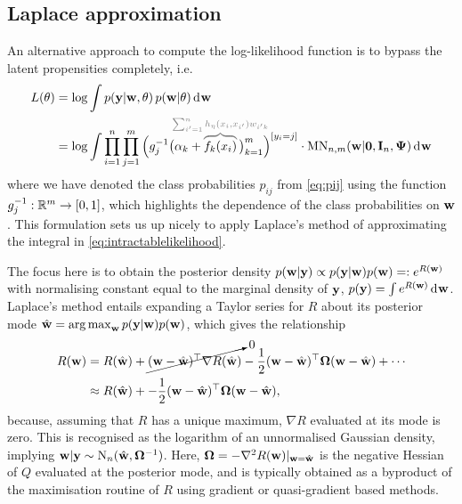 \subsection{Laplace approximation}

An alternative approach to compute the log-likelihood function is to bypass the latent propensities completely, i.e.
\begin{align}
  L(\theta) 
  &= \log \int p(\by | \bw, \theta) \, p(\bw|\theta) \dint \bw \nonumber \\
  &= \log \int \prod_{i=1}^n \prod_{j=1}^m \Big( g_j^{-1}\big(\alpha_k + 
  \greyoverbrace{f_k(x_i)}{\hidewidth\sum_{i'=1}^n h_\eta(x_i,x_{i'})w_{i'k}\hidewidth}
  \,\big)_{k=1}^m \Big)^{[y_i=j]} \cdot \MN_{n,m}(\bw|\bzero,\bI_n, \bPsi) \dint \bw \label{eq:intractablelikelihood}
\end{align}
where we have denoted the class probabilities $p_{ij}$ from \cref{eq:pij} using the function $g_j^{-1}:\mathbb{R}^m \to [0,1]$, which highlights the dependence of the class probabilities on ${\mathbf w}$.
This formulation sets us up nicely to apply Laplace's method of approximating the integral in \cref{eq:intractablelikelihood}.

The focus here is to obtain the posterior density $p({\mathbf w}|{\mathbf y}) \propto p({\mathbf y}|{\mathbf w})p({\mathbf w}) =: e^{R({\mathbf w})}$ with normalising constant equal to the marginal density of ${\mathbf y}$, $p({\mathbf y}) = \int e^{R({\mathbf w})} \operatorname{d}\hspace{0.5pt}\! {\mathbf w}$.
Laplace's method \citep[§4.1.1, pp. 777--778]{kass1995bayes} entails expanding a Taylor series for $R$ about its posterior mode $\hat{{\mathbf w}} = \operatorname*{arg\,max}_{\mathbf w} p({\mathbf y}|{\mathbf w})p({\mathbf w})$, which gives the relationship
\begin{align*}
  R({\mathbf w}) 
  &= R(\hat{{\mathbf w}}) + 
  \cancelto{0}{({\mathbf w} - \hat{{\mathbf w}})^\top \nabla R(\hat{{\mathbf w}})} 
  - \frac{1}{2} ({\mathbf w} - \hat{{\mathbf w}})^\top {\bm\Omega} ({\mathbf w} - \hat{{\mathbf w}}) + \cdots \\
  &\approx R(\hat{{\mathbf w}}) + 
  - \frac{1}{2} ({\mathbf w} - \hat{{\mathbf w}})^\top {\bm\Omega} ({\mathbf w} - \hat{{\mathbf w}}),
\end{align*}
because, assuming that $R$ has a unique maximum, $\nabla R$ evaluated at its mode is zero.
This is recognised as the logarithm of an unnormalised Gaussian density, implying ${\mathbf w}|{\mathbf y} \sim \operatorname{N}_n(\hat{{\mathbf w}},{\bm\Omega}^{-1})$.
Here, ${\bm\Omega} = -\nabla^2 R({\mathbf w})|_{{\mathbf w}=\hat{{\mathbf w}}}$ is the negative Hessian of $Q$ evaluated at the posterior mode, and is typically obtained as a byproduct of the maximisation routine of $R$ using gradient or quasi-gradient based methods.

